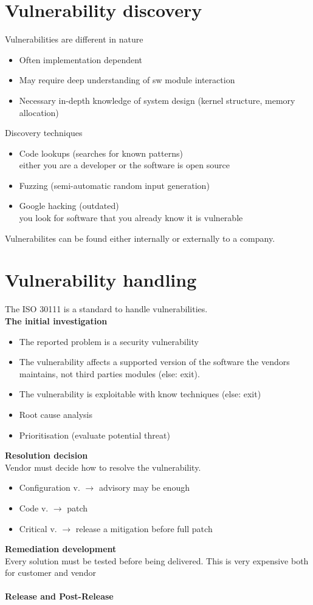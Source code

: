 \documentclass[10pt,a4paper]{book}
\begin{document}
\section{Vulnerability discovery}
Vulnerabilities are different in nature
\begin{itemize}
\item Often implementation dependent
\item May require deep understanding of sw module interaction
\item Necessary in-depth knowledge of system design (kernel structure, memory allocation)
\end{itemize}
Discovery techniques
\begin{itemize}
\item Code lookups (searches for known patterns)\\
either you are a developer or the software is open source
\item Fuzzing (semi-automatic random input generation)
\item Google hacking (outdated)\\
you look for software that you already know it is vulnerable
\end{itemize}
Vulnerabilites can be found either internally or externally to a company.\\
\section{Vulnerability handling}
The ISO 30111 is a standard to handle vulnerabilities.\\
\textbf{The initial investigation}
\begin{itemize}
\item The reported problem is a security vulnerability
\item The vulnerability affects a supported version of the software the vendors maintains, not third parties modules (else: exit).
\item The vulnerability is exploitable with know techniques (else: exit)
\item Root cause analysis
\item Prioritisation (evaluate potential threat)
\end{itemize}
\textbf{Resolution decision}\\
Vendor must decide how to resolve the vulnerability.
\begin{itemize}
\item Configuration v. $\to$ advisory may be enough
\item Code v. $\to$ patch
\item Critical v. $\to$ release a mitigation before full patch
\end{itemize}
\textbf{Remediation development}\\
Every solution must be tested before being delivered. This is very expensive both for customer and vendor\\\\
\textbf{Release and Post-Release}\\
\end{document}
